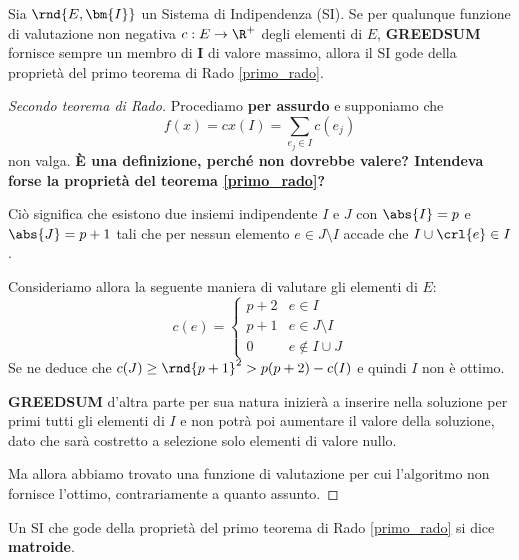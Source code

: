 \documentclass[\main/main.tex]{subfiles}
\begin{document}
\begin{theorem}
  Sia \(\rnd{E, \bm{I}}\) un Sistema di Indipendenza (SI). Se per qualunque funzione di valutazione non negativa \(c: E \rightarrow \R^+\) degli elementi di \(E\), \textbf{GREEDSUM} fornisce sempre un membro di \(\bm{I}\) di valore massimo, allora il SI gode della proprietà del primo teorema di Rado \ref{primo_rado}.
\end{theorem}
\begin{proof}[Secondo teorema di Rado]
  Procediamo \textbf{per assurdo} e supponiamo che
  \[
    f(x) = c x(I) = \sum_{e_j \in I} c(e_j)
  \]
  non valga. \textbf{È una definizione, perché non dovrebbe valere? Intendeva forse la proprietà del teorema \ref{primo_rado}?}

  Ciò significa che esistono due insiemi indipendente \(I\) e \(J\) con \(\abs{I} = p\) e \(\abs{J} = p+1\) tali che per nessun elemento \(e \in J \setminus I\) accade che \(I \cup \crl{e} \in I\).

  Consideriamo allora la seguente maniera di valutare gli elementi di \(E\):
  \[
    c(e) = \begin{cases}
      p+2 & e \in I            \\
      p+1 & e \in J\setminus I \\
      0   & e \not\in I \cup J
    \end{cases}
  \]
  Se ne deduce che \(c(J) \geq \rnd{p+1}^2 > p(p+2) - c(I)\) e quindi \(I\) non è ottimo.

  \textbf{GREEDSUM} d'altra parte per sua natura inizierà a inserire nella soluzione per primi tutti gli elementi di \(I\) e non potrà poi aumentare il valore della soluzione, dato che sarà costretto a selezione solo elementi di valore nullo.

  Ma allora abbiamo trovato una funzione di valutazione per cui l'algoritmo non fornisce l'ottimo, contrariamente a quanto assunto.
\end{proof}
\begin{definition}[Matroide]
  Un SI che gode della proprietà del primo teorema di Rado \ref{primo_rado} si dice \textbf{matroide}.
\end{definition}
\end{document}
